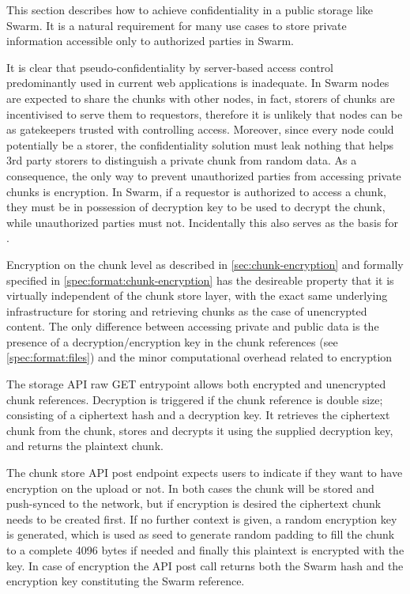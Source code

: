 This section describes how to achieve confidentiality in a  public storage like Swarm. 
It is a natural requirement for many use cases to store private information accessible only to authorized parties in Swarm. 

It is clear that pseudo-confidentiality by server-based access  control predominantly used in current web applications is inadequate. In Swarm nodes are expected to share the chunks with other nodes, in fact, storers of chunks are  incentivised to serve them to requestors, therefore it is unlikely that nodes can be as gatekeepers trusted with controlling access. Moreover, since every node could potentially be a storer, the confidentiality solution must leak nothing that helps 3rd party storers to distinguish a private chunk from random data. As a consequence, the only way to prevent unauthorized parties from accessing private chunks is encryption. In Swarm, if a requestor is authorized to access a chunk, they must be in possession of decryption key to be used to decrypt the chunk, while unauthorized parties must not. Incidentally this also serves as the basis for .

Encryption on the chunk level as described in \ref{sec:chunk-encryption} and formally specified in \ref{spec:format:chunk-encryption}
has the desireable property that it is virtually independent of the chunk store layer, with the exact same underlying infrastructure for storing and retrieving chunks as the case of unencrypted content.
The only difference between accessing private and public data is the presence of a decryption/encryption key in the chunk references (see \ref{spec:format:files}) and the minor computational overhead related to encryption


The storage API raw GET entrypoint allows both encrypted and unencrypted chunk  references. 
Decryption is  triggered if the chunk reference is double size; consisting of a ciphertext hash and a decryption key.  It retrieves the ciphertext chunk from the chunk,  stores and decrypts it using the supplied decryption key, and returns the plaintext chunk.

The chunk store API post endpoint expects users to indicate if they want to have encryption on the upload or not. In both cases the chunk will be stored and push-synced to the network, but if encryption is desired the ciphertext chunk needs to be created first. If no further context is given, a random encryption key is generated, which is used as seed to generate random padding to fill the chunk to a complete 4096 bytes if needed and finally this plaintext is encrypted with the key. In case of encryption the API post call returns both the Swarm hash and the encryption key constituting the Swarm reference. 

